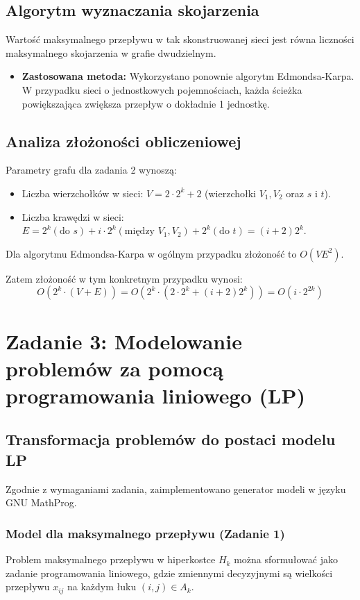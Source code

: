 \documentclass[11pt, a4paper]{article}
\begin{document}
	\subsection{Algorytm wyznaczania skojarzenia}
	Wartość maksymalnego przepływu w tak skonstruowanej sieci jest równa liczności maksymalnego skojarzenia w grafie dwudzielnym. 
	\begin{itemize}
		\item \textbf{Zastosowana metoda:} Wykorzystano ponownie algorytm Edmondsa-Karpa. W przypadku sieci o jednostkowych pojemnościach, każda ścieżka powiększająca zwiększa przepływ o dokładnie 1 jednostkę.
	\end{itemize}
	
	\subsection{Analiza złożoności obliczeniowej}
	Parametry grafu dla zadania 2 wynoszą:
	\begin{itemize}
		\item Liczba wierzchołków w sieci: $V = 2 \cdot 2^k + 2$ (wierzchołki $V_1, V_2$ oraz $s$ i $t$).
		\item Liczba krawędzi w sieci: $E = 2^k (\text{do } s) + i \cdot 2^k (\text{między } V_1, V_2) + 2^k (\text{do } t) = (i+2)2^k$.
	\end{itemize}
	
	Dla algorytmu Edmondsa-Karpa w ogólnym przypadku złożoność to $O(VE^2)$. 
	
	Zatem złożoność w tym konkretnym przypadku wynosi:
	\begin{equation}
		O(2^k \cdot (V + E)) = O(2^k \cdot (2 \cdot 2^k + (i+2)2^k)) = O(i \cdot 2^{2k})
	\end{equation}

	\section{Zadanie 3: Modelowanie problemów za pomocą programowania liniowego (LP)}
	
	\subsection{Transformacja problemów do postaci modelu LP}
	Zgodnie z wymaganiami zadania, zaimplementowano generator modeli w języku GNU MathProg.
	
	\subsubsection{Model dla maksymalnego przepływu (Zadanie 1)}
	Problem maksymalnego przepływu w hiperkostce $H_k$ można sformułować jako zadanie programowania liniowego, gdzie zmiennymi decyzyjnymi są wielkości przepływu $x_{ij}$ na każdym łuku $(i,j) \in A_k$.
	
\end{document}
